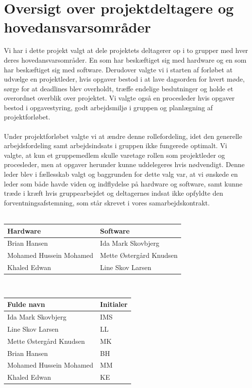 \section{Oversigt over projektdeltagere og hovedansvarsområder}
Vi har i dette projekt valgt at dele projektets deltagerer op i to grupper med hver deres hovedansvarsområder. En som har beskæftiget sig med hardware og en som har beskæftiget sig med software. Derudover valgte vi i starten af forløbet at udvælge en projektleder, hvis opgaver bestod i at lave dagsorden for hvert møde, sørge for at deadlines blev overholdt, træffe endelige beslutninger og holde et overordnet overblik over projektet. Vi valgte også en procesleder hvis opgaver bestod i opgavestyring, godt arbejdsmiljø i gruppen og planlægning af projektforløbet. \\
\\
Under projektforløbet valgte vi at ændre denne rollefordeling, idet den generelle arbejdsfordeling samt arbejdsindsats i gruppen ikke fungerede optimalt. Vi valgte, at kun et gruppemedlem skulle varetage rollen som projektleder og procesleder, men at opgaver herunder kunne uddelegeres hvis nødvendigt. Denne leder blev i fællesskab valgt og baggrunden for dette valg var, at vi ønskede en leder som både havde viden og indflydelse på hardware og software, samt kunne træde i kræft hvis gruppearbejdet og deltagernes indsat ikke opfyldte den forventningsafstemning, som står skrevet i vores samarbejdskontrakt. \\\\
\begin{tabular}{| l | l |} \hline
\textbf{Hardware} & \textbf{Software}\\\hline
Brian Hansen & Ida Mark Skovbjerg \\\hline 
Mohamed Hussein Mohamed & Mette Østergård Knudsen \\\hline
Khaled Edwan & Line Skov Larsen  \\\hline 
\end{tabular}
\\
\begin{tabular}{| l | l |} \hline
\textbf{Fulde navn} & \textbf{Initialer}\\\hline
Ida Mark Skovbjerg & IMS \\\hline 
Line Skov Larsen & LL \\\hline
Mette Østergård Knudsen & MK  \\\hline 
Brian Hansen & BH \\\hline
Mohamed Hussein Mohamed & MM \\\hline 
Khaled Edwan & KE \\\hline
\end{tabular}



